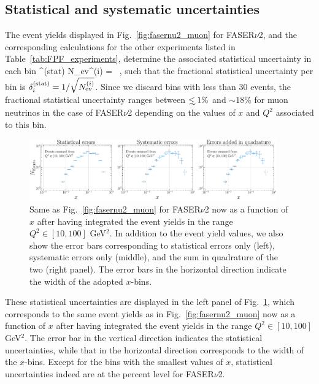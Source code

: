 \subsection{Statistical and systematic uncertainties}
\label{subsec:uncertainties}

The event yields displayed in Fig.~\ref{fig:fasernu2_muon} for FASER$\nu$2, and the corresponding
calculations for the other experiments listed in Table~\ref{tab:FPF_experiments},
determine the associated statistical uncertainty in each bin
\be
\label{eq:statistical_uncertainties}
\delta^{\rm (stat)}  N_{\rm ev}^{(i)} =  \, ,
\ee
such that the fractional statistical uncertainty per bin is $\delta^{\rm (stat)}_i=1/\sqrt{N_{\rm ev}^{(i)}}$.
%
Since we discard bins with less than 30 events, the fractional statistical uncertainty
ranges between $\lsim 1\%$ and $\sim 18\%$ for muon neutrinos in
the case of FASER$\nu$2 depending on the values of
$x$ and $Q^2$ associated to this bin.

\begin{figure}[h]
    \centering
    \includegraphics[width = 0.95\textwidth]{plots/error_plot_FASERv2_14.pdf}
    \caption{Same as Fig.~\ref{fig:fasernu2_muon} for FASER$\nu$2
      now as a function of $x$ after having integrated the event yields in the range $Q^2 \in [10,100]$ GeV$^2$.
      In addition to the event yield values, we also show the error bars corresponding to
      statistical errors only (left), systematic errors only (middle), and the
      sum in quadrature of the two (right panel).
      The error bars in the horizontal direction indicate the width of the adopted $x$-bins.
      }
    \label{fig:error_plot_FASERv2_14}
\end{figure}

These statistical uncertainties are displayed in the left panel
of Fig.~\ref{fig:error_plot_FASERv2_14}, which corresponds
to the same event yields as in
Fig.~\ref{fig:fasernu2_muon}
now as a function of $x$ after having integrated the event yields in the range $Q^2 \in [10,100]$ GeV$^2$.
%
The error bar in the vertical direction indicates the statistical uncertainties, while
that in the horizontal direction corresponds to the width of the $x$-bins.
%
Except for the bins with the smallest values of $x$, statistical uncertainties indeed
are at the percent level for FASER$\nu$2.

